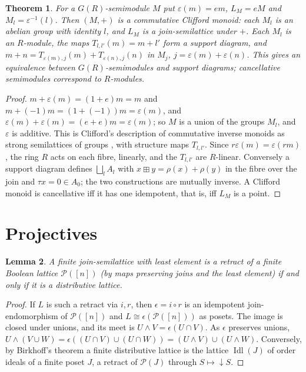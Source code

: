 \documentclass[11pt]{amsart}
\newtheorem{theorem}{Theorem}[section]
\newtheorem{lemma}[theorem]{Lemma}
\theoremstyle{remark}\newtheorem{remark}[theorem]{Remark}
\begin{document}
\begin{theorem}\label{modules}
For a $G(R)$-semimodule $M$ put $\varepsilon(m)=em$, $L_M=eM$ and $M_l=\varepsilon^{-1}(l)$. Then $(M,+)$ is a
commutative Clifford monoid: each $M_l$ is an abelian group with identity $l$, and $L_M$ is a join-semilattice under
$+$. Each $M_l$ is an $R$-module, the maps $T_{l,l'}(m)=m+l'$ form a support diagram, and
$m+n=T_{\varepsilon(m),j}(m)+T_{\varepsilon(n),j}(n)$ in $M_j$, $j=\varepsilon(m)+\varepsilon(n)$. This gives an
equivalence between $G(R)$-semimodules and support diagrams; cancellative semimodules correspond to $R$-modules.
\end{theorem}
\begin{proof}
$m+\varepsilon(m)=(1+e)m=m$ and $m+(-1)m=(1+(-1))m=\varepsilon(m)$, and $\varepsilon(m)+\varepsilon(m)=(e+e)m=
\varepsilon(m)$; so $M$ is a union of the groups $M_l$, and $\varepsilon$ is additive. This is Clifford's description of
commutative inverse monoids as strong semilattices of groups \cite{clifford,howie}, with structure maps $T_{l,l'}$.
Since $r\varepsilon(m)=\varepsilon(rm)$, the ring $R$ acts on each fibre, linearly, and the $T_{l,l'}$ are $R$-linear.
Conversely a support diagram defines $\bigsqcup_l A_l$ with $x\boxplus y=\rho(x)+\rho(y)$ in the fibre over the join and
$\tau x=0\in A_{0}$; the two constructions are mutually inverse. A Clifford monoid is cancellative iff it has one
idempotent, that is, iff $L_M$ is a point.
\end{proof}

\section{Projectives}
\begin{lemma}\label{retract}
A finite join-semilattice with least element is a retract of a finite Boolean lattice $\mathcal P([n])$ (by maps
preserving joins and the least element) if and only if it is a distributive lattice.
\end{lemma}
\begin{proof}
If $L$ is such a retract via $i,r$, then $\epsilon=i\circ r$ is an idempotent join-endomorphism of $\mathcal P([n])$
and $L\cong\epsilon(\mathcal P([n]))$ as posets. The image is closed under unions, and its meet is
$U\wedge V=\epsilon(U\cap V)$. As $\epsilon$ preserves unions,
$U\wedge(V\cup W)=\epsilon((U\cap V)\cup(U\cap W))=(U\wedge V)\cup(U\wedge W)$. Conversely, by Birkhoff's theorem a
finite distributive lattice is the lattice $\operatorname{Idl}(J)$ of order ideals of a finite poset $J$, a retract of
$\mathcal P(J)$ through $S\mapsto{\downarrow}S$.
\end{proof}
\end{document}
